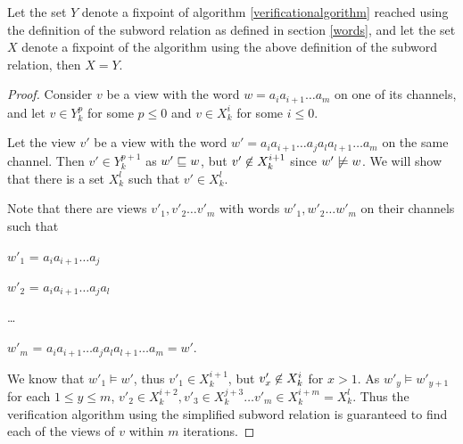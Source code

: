 \begin{lemma}
Let the set $Y$ denote a fixpoint of algorithm \ref{verificationalgorithm} reached using the definition of the subword relation as defined in section \ref{words}, and let the set $X$ denote a fixpoint of the algorithm using the above definition of the subword relation, then $X=Y$.
\end{lemma}
\begin{proof}
Consider $v$ be a view with the word $w = a_ia_{i+1}\ldots a_m$ on one of its channels, and let $v\in Y_k^p$ for some $p \leq 0$ and $v\in X_k^i$ for some $i \leq 0$.

Let the view $v'$ be a view with the word $w' = a_ia_{i+1}\ldots a_ja_la_{l+1}\ldots a_m$ on the same channel. Then $v' \in Y_k^{p+1}$ as $w' \sqsubseteq w$, but $v' \centernot\in X_k^{i+1}$ since $w' \centernot\models w$. We will show that there is a set $X_k^l$ such that $v'\in X_k^l$.


Note that there are views $v'_1, v'_2\ldots v'_m$ with words $w'_1, w'_2\ldots w'_m$ on their channels such that

\hspace{10mm}
$w'_1$ =  $a_ia_{i+1}\ldots a_j$

\hspace{10mm}
$w'_2$ = $a_ia_{i+1}\ldots a_ja_l$

\hspace{10mm}
\ldots

\hspace{10mm}
$w'_{m}$ = $a_ia_{i+1}\ldots a_ja_la_{l+1}\ldots a_{m} = w'$.

We know that $w'_1 \models w'$, thus $v'_1 \in X_k^{i+1}$, but $v'_x \centernot\in X_k^i$ for $x > 1$. As $w'_y \models w'_{y+1}$ for each $1 \leq y \leq m$, $v'_2 \in X_k^{i+2}, v'_3 \in X_k^{j+3} \ldots v'_m \in X_k^{i+m} = X_k^l$. Thus the verification algorithm using the simplified subword relation is guaranteed to find each of the views of $v$ within $m$ iterations.

\end{proof}


